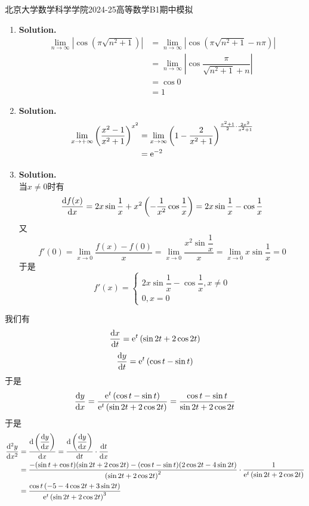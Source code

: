 \documentclass{ctexart}
\begin{document}
\pagestyle{empty}
\begin{center}\Large
    北京大学数学科学学院2024-25高等数学B1期中模拟
\end{center}
\begin{solution}
    \begin{enumerate}[label=\textbf{(\arabic*)}]
        \item \textbf{Solution.}
            $$\begin{aligned}
                \lim_{n\to\infty}\left|\cos\left(\pi\sqrt{n^2+1}\right)\right|
                &= \lim_{n\to\infty}\left|\cos\left(\pi\sqrt{n^2+1}-n\pi\right)\right| \\
                &= \lim_{n\to\infty}\left|\cos\dfrac{\pi}{\sqrt{n^2+1}+n}\right| \\
                &= \cos 0 \\
                &= 1
            \end{aligned}$$
        \item \textbf{Solution.}
            $$\begin{aligned}
                \lim_{x\to+\infty}\left(\dfrac{x^2-1}{x^2+1}\right)^{x^2}
                &= \lim_{x\to\infty}\left(1-\dfrac{2}{x^2+1}\right)^{\frac{x^2+1}{2}\cdot\frac{2x^2}{x^2+1}} \\
                &= \mathrm{e}^{-2}
            \end{aligned}$$
        \item \textbf{Solution.}\\
            当$x\neq0$时有
            $$\dfrac{\mathrm{d} f(x)}{\mathrm{d} x}=2x\sin\dfrac{1}{x}+x^2\left(-\dfrac{1}{x^2}\cos\dfrac{1}{x}\right)=2x\sin\dfrac{1}{x}-\cos\dfrac{1}{x}$$
            又$$f'(0)=\lim_{x\to0}\dfrac{f(x)-f(0)}{x}=\lim_{x\to0}\dfrac{x^2\sin\dfrac{1}{x}}{x}=\lim_{x\to0}x\sin\dfrac{1}{x}=0$$
            于是$$f'(x)=\left\{\begin{array}{l}
                2x\sin\dfrac{1}{x}-\cos\dfrac{1}{x},x\neq0\\0,x=0
            \end{array}\right.$$
    \end{enumerate}
\end{solution}
\begin{solution}[Solution.]
    我们有
    $$\dfrac{\mathrm{d} x}{\mathrm{d} t}=\mathrm{e}^t\left(\sin2t+2\cos2t\right)$$
    $$\dfrac{\mathrm{d} y}{\mathrm{d} t}=\mathrm{e}^t\left(\cos t-\sin t\right)$$
    于是$$\dfrac{\mathrm{d} y}{\mathrm{d} x}=\dfrac{\mathrm{e}^t\left(\cos t-\sin t\right)}{\mathrm{e}^t\left(\sin2t+2\cos2t\right)}=\dfrac{\cos t-\sin t}{\sin2t+2\cos2t}$$
    于是$$\begin{aligned}
        \dfrac{\mathrm{d}^2y}{\mathrm{d} x^2}
        &= \dfrac{\mathrm{d}\left(\dfrac{\mathrm{d} y}{\mathrm{d} x}\right)}{\mathrm{d} x}=\dfrac{\mathrm{d}\left(\dfrac{\mathrm{d} y}{\mathrm{d} x}\right)}{\mathrm{d} t}\cdot\dfrac{\mathrm{d} t}{\mathrm{d} x} \\
        &= \dfrac{-(\sin t+\cos t)(\sin 2t+2\cos 2t)-(\cos t-\sin t)(2\cos2t-4\sin2t)}{\left(\sin2t+2\cos2t\right)^2}\cdot\dfrac{1}{\mathrm{e}^t\left(\sin2t+2\cos2t\right)} \\
        &= \dfrac{\cos t\left(-5-4\cos2t+3\sin2t\right)}{\mathrm{e}^t\left(\sin2t+2\cos2t\right)^3}
    \end{aligned}$$
\end{solution}
\end{document}
